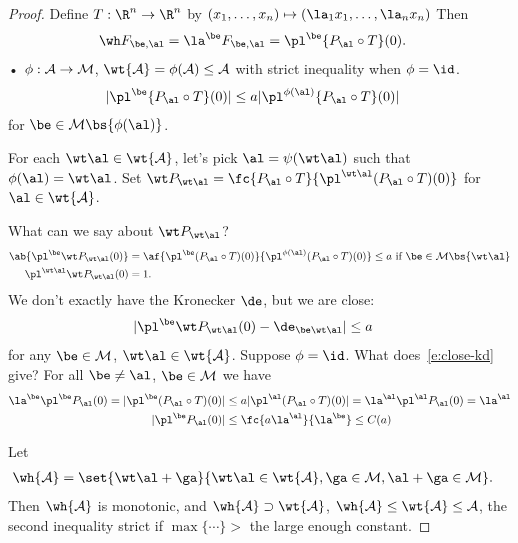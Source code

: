 \begin{proof}
Define $T:\R^n\to \R^n$ by $(x_1,\ldots, x_n)\mapsto (\la_1x_1,\ldots, \la_nx_n)$
Then 
\begin{align}
\wh F_{\be,\al} &=\la^\be F_{\be,\al} = \pl^\be \{P_\al\circ T\} (0).
\end{align}•
$\phi:\cal A\to \cal M$, $\wt{\cal A}=\phi(\cal A)\le \cal A$ with strict inequality when $\phi=\id$. 
\begin{align}
|\pl^\be \{P_\al\circ T\}(0)|
&\le a|\pl^{\phi(\al)}\{P_\al\circ T\}(0)|
\end{align}
for $\be\in \cal M\bs \{\phi(\al)\}$. 

For each $\wt\al \in \wt{\cal A}$, let's pick $\al=\psi(\wt \al)$ such that $\phi(\al)=\wt \al$.
Set $\wt P_{\wt \al} = \fc{P_\al\circ T}{\pl^{\wt \al}(P_\al\circ T)(0)}$ for $\al\in \wt{\cal A}$. 

What can we say about $\wt P_{\wt \al}$?
\begin{align}
\ab{\pl^\be \wt P_{\wt \al}(0)}
&=\af{\pl^\be(P_\al\circ T)(0)}{\pl^{\phi(\al)}(P_\al\circ T)(0)}
\le a\text{ if }\be \in \cal M\bs \{\wt \al\}\\
\pl^{\wt \al}{\wt P_{\wt\al}}(0)&=1.
\end{align}
We don't exactly have the Kronecker $\de$, but we are close:
\begin{align}\label{e:close-kd}
|\pl^\be \wt P_{\wt \al}(0) - \de_{\be \wt \al}|&\le a
\end{align}
for any $\be\in \cal M$, $\wt \al\in \wt{ \cal A}$.
Suppose $\phi=\id$. What does~\eqref{e:close-kd} give? For all $\be \ne \al$, $\be \in \cal M$ we have
\begin{align}\la^\be \pl^\be P_\al(0) = 
|\pl^\be(P_\al\circ T)(0)|&\le a |\pl^\al(P_\al\circ T)(0)| = \la^\al\pl^\al P_\al(0) = \la^\al\\
|\pl^\be P_\al(0)| &\le \fc{a\la^\al}{\la^\be} \le C(a)
\end{align}

Let 
\begin{align}
\wh{\cal A}&=\set{\wt \al + \ga }{\wt \al \in \wt{\cal A}, \ga\in \cal M, \al+\ga\in \cal M}. 
\end{align}
Then $\wh{\cal A}$ is monotonic, and $\wh{\cal A}\supset \wt{\cal A}$, $\wh{\cal A}\le \wt{\cal A}\le \cal A$, the second inequality strict if $\max\{\cdots\}>$ the large enough constant. 


\end{proof}

